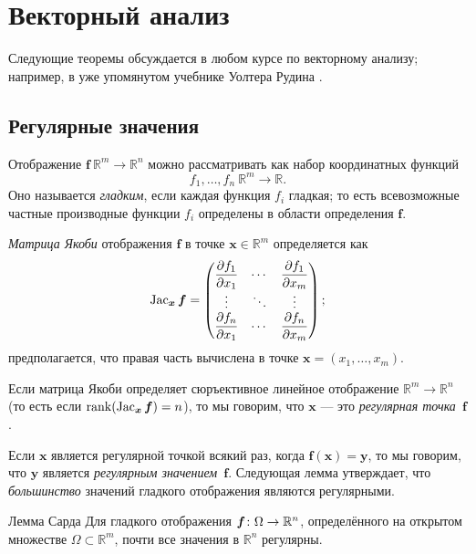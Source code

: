 \section{Векторный анализ}\label{sec:Multivariable calculus}

Следующие теоремы обсуждается в любом курсе по векторному анализу;
например, в уже упомянутом учебнике Уолтера Рудина \cite{rudin}.

\subsection*{Регулярные значения}

Отображение $\bm{f}\:\mathbb{R}^m\to\mathbb{R}^n$ можно рассматривать как набор координатных функций 
\[f_1,\dots,f_n\:\mathbb{R}^m\to \mathbb{R}.\]
Оно называется \emph{гладким}, если каждая функция $f_i$ гладкая;
то есть всевозможные частные производные функции $f_i$ определены в области определения $\bm{f}$.

\emph{Матрица Якоби} отображения $\bm{f}$ в точке $\bm{x}\in\mathbb{R}^m$ определяется как 
\[\mathop{\rm Jac}\nolimits_{\bm{x}}\bm{f}=
\begin{pmatrix}
\dfrac{\partial f_1}{\partial x_1} & \cdots & \dfrac{\partial f_1}{\partial x_m}\\
\vdots & \ddots & \vdots\\
\dfrac{\partial f_n}{\partial x_1} & \cdots & \dfrac{\partial f_n}{\partial x_m} \end{pmatrix};\]
предполагается, что правая часть вычислена в точке $\bm{x}=(x_1,\dots,x_m)$.

Если матрица Якоби определяет сюръективное линейное отображение $\mathbb{R}^m\to\mathbb{R}^n$ (то есть если $\mathop{\rm rank}\nolimits(\mathop{\rm Jac}\nolimits_{\bm{x}}\bm{f})=n$), то мы говорим, что 
$\bm{x}$ --- это \emph{регулярная точка}~$\bm{f}$.

Если $\bm{x}$ является регулярной точкой всякий раз, когда $\bm{f}(\bm{x})=\bm{y}$,
то мы говорим, что $\bm{y}$ является \emph{регулярным значением}~$\bm{f}$.
Следующая лемма утверждает, что \textit{большинство} значений гладкого отображения являются регулярными.

\begin{thm}{Лемма Сарда}\label{lem:sard}
Для гладкого отображения $\bm{f}\colon \Omega \z\to \mathbb{R}^n$, определённого на открытом множестве $\Omega\subset \mathbb{R}^m$, почти все значения в $\mathbb{R}^n$ регулярны.
\end{thm}

